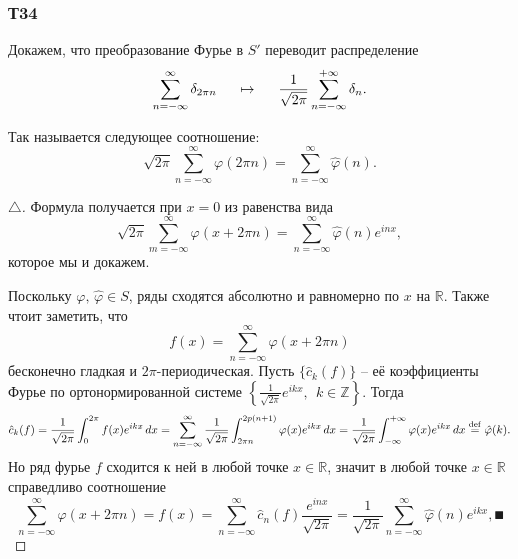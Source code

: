 \subsubsection*{Т34}

Докажем, что преобразование Фурье в $S'$ переводит распределение
\begin{equation*}
    \sum_{n=-\infty}^{\infty} \delta_{2\pi n} \hspace{5 mm} 
    \mapsto
    \hspace{5 mm} 
    \frac{1}{\sqrt{2\pi}} \sum_{n=-\infty}^{+\infty} \delta_n.
\end{equation*}


\begin{to_thr}
    Так называется следующее соотношение:
    \begin{equation*}
        \sqrt{2\pi} \sum_{n=-\infty}^{\infty}  \varphi(2 \pi n) = \sum_{n=-\infty}^{\infty} \hat{\varphi} (n).
    \end{equation*}
\end{to_thr}

\begin{proof}[$\triangle$]
Формула получается при $x= 0$ из равенства вида
\begin{equation*}
    \sqrt{2\pi} \sum_{m=-\infty}^{\infty} \varphi(x + 2 \pi n) = \sum_{n=-\infty}^{\infty}  \hat{\varphi} (n) e^{i n x},
\end{equation*}
которое мы и докажем. 

Поскольку $\varphi,\, \hat{\varphi} \in S$, ряды сходятся абсолютно и равномерно по $x$ на $\mathbb{R}$. Также чтоит заметить, что
\begin{equation*}
    f(x) = \sum_{n=-\infty}^{\infty}  \varphi(x + 2 \pi n)
\end{equation*}
бесконечно гладкая и $2\pi$-периодическая. Пусть $\{\hat{c}_k (f)\}$ -- её коэффициенты Фурье по ортонормированной  системе $\left\{\frac{1}{\sqrt{2\pi}} e^{ikx}, \ \ k \in \mathbb{Z}\right\}$. Тогда 
\begin{equation*}
    \hat{c}_k (f) = \frac{1}{\sqrt{2\pi}} \int_0^{2\pi} f(x) e^{ikx} \, d x = 
    \sum_{n=-\infty}^{\infty} \frac{1}{\sqrt{2\pi}} \int_{2 \pi n}^{2p(n+1)} \varphi(x) e^{ikx} \, d x = 
    \frac{1}{\sqrt{2\pi}} \int_{-\infty}^{+\infty} \varphi(x) e^{ikx} \, d x \overset{\mathrm{def}}{=}  \hat{\varphi}(k). 
\end{equation*}
Но ряд фурье $f$ сходится к ней в любой точке $x \in \mathbb{R}$, значит в любой точке $x \in \mathbb{R}$ справедливо соотношение
\begin{equation*}
    \sum_{n=-\infty}^{\infty} \varphi(x+2\pi n) = f(x) = \sum_{n=-\infty}^{\infty} \hat{c}_n (f) \frac{e^{inx}}{\sqrt{2\pi}} = \frac{1}{\sqrt{2\pi}} \sum_{n=-\infty}^{\infty}  \hat{\varphi} (n) e^{ikx}, \QED
\end{equation*}

\end{proof}


